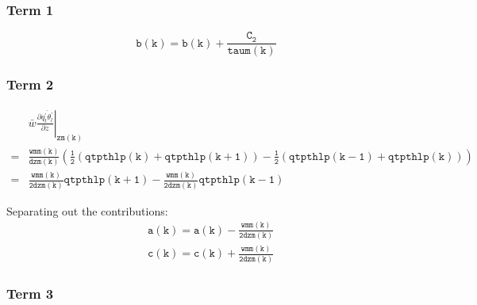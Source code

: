 \documentclass[11pt,fleqn]{article}
\newcommand{\ptlder}[2]{\frac{\partial #1}{\partial #2}}
\begin{document}
\subsubsection{Term 1}

\begin{equation}
\mathtt{ b(k) = b(k) + \frac{C_2}{taum(k)} }
\end{equation}

\subsubsection{Term 2}

\begin{equation}
\begin{split}
& \left. \bar{w}\ptlder{\overline{q_t^{'}\theta_l^{'}}}{z} \right|_{\mathtt{zm(k)}} \\
=& \mathtt{ \frac{wmm(k)}{dzm(k)}
   \left(
     \frac{1}{2} \left( qtpthlp(k)+qtpthlp(k+1) \right)
     - \frac{1}{2} \left( qtpthlp(k-1)+qtpthlp(k) \right)
   \right) } \\
=& \mathtt{ \frac{wmm(k)}{2 dzm(k)} qtpthlp(k+1) - \frac{wmm(k)}{2 dzm(k)} qtpthlp(k-1) }
\end{split}
\end{equation}

Separating out the contributions:
%
\begin{equation}
\begin{split}
& \mathtt{ a(k) = a(k) - \frac{wmm(k)}{2 dzm(k)} } \\
& \mathtt{ c(k) = c(k) + \frac{wmm(k)}{2 dzm(k)} }
\end{split}
\end{equation}

\subsubsection{Term 3}
\end{document}
